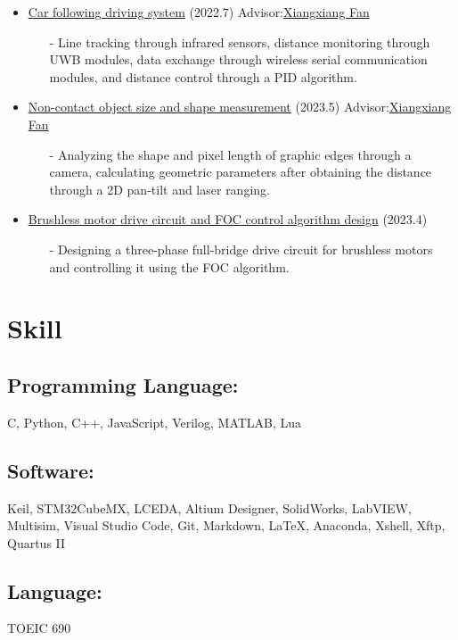\documentclass{article}
\begin{document}
\begin{itemize}
    \item \href{http://resume.uint16kun.com/my-projects/Car%20following%20driving%20system.html}{Car following driving system} (2022.7)     Advisor:\href{http://xxgcxy.zjhu.edu.cn/2021/0326/c5544a166633/page.htm}{Xiangxiang Fan}
          \begin{itemize}
              \item[-] Line tracking through infrared sensors, distance monitoring through UWB modules, data exchange through wireless serial communication modules, and distance control through a PID algorithm.
          \end{itemize}
    \item \href{http://resume.uint16kun.com/my-projects/Non-contact%20object%20size%20and%20shape%20measurement.html}{Non-contact object size and shape measurement} (2023.5)     Advisor:\href{http://xxgcxy.zjhu.edu.cn/2021/0326/c5544a166633/page.htm}{Xiangxiang Fan}
          \begin{itemize}
              \item[-] Analyzing the shape and pixel length of graphic edges through a camera, calculating geometric parameters after obtaining the distance through a 2D pan-tilt and laser ranging.
          \end{itemize}
    \item \href{http://resume.uint16kun.com/my-projects/Brushless%20motor%20drive%20circuit%20and%20FOC%20control%20algorithm%20design.html}{Brushless motor drive circuit and FOC control algorithm design} (2023.4)
          \begin{itemize}
              \item[-] Designing a three-phase full-bridge drive circuit for brushless motors and controlling it using the FOC algorithm.
          \end{itemize}
\end{itemize}

\section*{Skill}
\subsection*{Programming Language:}
C, Python, C++, JavaScript, Verilog, MATLAB, Lua

\subsection*{Software:}
Keil, STM32CubeMX, LCEDA, Altium Designer, SolidWorks, LabVIEW, Multisim, Visual Studio Code, Git, Markdown, LaTeX, Anaconda, 
Xshell, Xftp, Quartus II
\subsection*{Language:}
TOEIC 690
\end{document}
